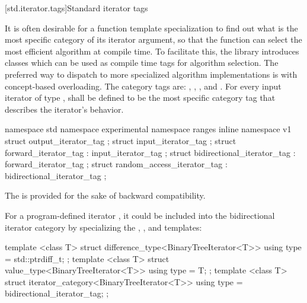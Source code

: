 [std.iterator.tags]{Standard iterator tags}

\pnum
{}%
%
%
%
%
It is often desirable for a
function template specialization
to find out what is the most specific category of its iterator
argument, so that the function can select the most efficient algorithm at compile time.
To facilitate this, the
library introduces
classes which can be used as compile time tags for algorithm selection.
\enternote The preferred way to dispatch to more specialized algorithm implementations is
with concept-based overloading.\exitnote
The category tags are:
,
,
,
and
.
For every input iterator of type
,
shall be defined to be the most specific category tag that describes the
iterator's behavior.

\begin{codeblock}
namespace std { namespace experimental { namespace ranges { inline namespace v1 {
  struct output_iterator_tag { };
  struct input_iterator_tag { };
  struct forward_iterator_tag : input_iterator_tag { };
  struct bidirectional_iterator_tag : forward_iterator_tag { };
  struct random_access_iterator_tag : bidirectional_iterator_tag { };
}}}}
\end{codeblock}

\pnum
\enternote
The  is provided for the sake of backward compatibility.
\exitnote

\pnum
{}%
%
%
%
%
%
\enterexample
For a program-defined iterator
,
it could be included
into the bidirectional iterator category by specializing the
, , and
 templates:

\begin{codeblock}
template <class T> struct difference_type<BinaryTreeIterator<T>> {
  using type = std::ptrdiff_t;
};
template <class T> struct value_type<BinaryTreeIterator<T>> {
  using type = T;
};
template <class T> struct iterator_category<BinaryTreeIterator<T>> {
  using type = bidirectional_iterator_tag;
};
\end{codeblock}
\exitexample

